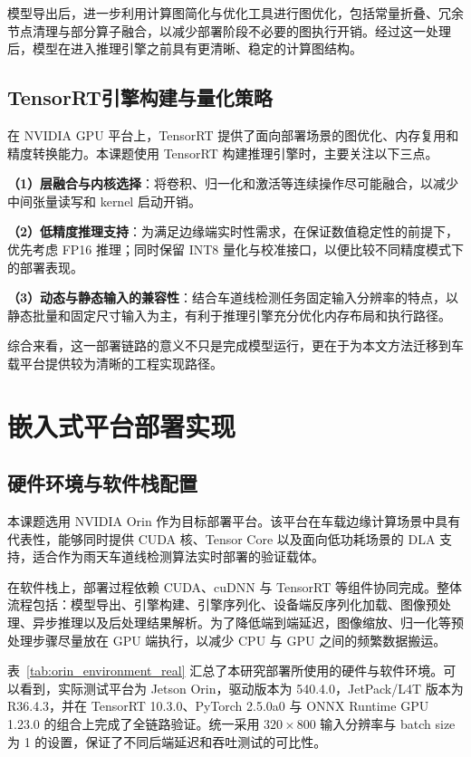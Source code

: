 模型导出后，进一步利用计算图简化与优化工具进行图优化，包括常量折叠、冗余节点清理与部分算子融合，以减少部署阶段不必要的图执行开销。经过这一处理后，模型在进入推理引擎之前具有更清晰、稳定的计算图结构。

\subsection{TensorRT引擎构建与量化策略}

在 NVIDIA GPU 平台上，TensorRT 提供了面向部署场景的图优化、内存复用和精度转换能力。本课题使用 TensorRT 构建推理引擎时，主要关注以下三点。

\textbf{（1）层融合与内核选择}：将卷积、归一化和激活等连续操作尽可能融合，以减少中间张量读写和 kernel 启动开销。

\textbf{（2）低精度推理支持}：为满足边缘端实时性需求，在保证数值稳定性的前提下，优先考虑 FP16 推理；同时保留 INT8 量化与校准接口，以便比较不同精度模式下的部署表现。

\textbf{（3）动态与静态输入的兼容性}：结合车道线检测任务固定输入分辨率的特点，以静态批量和固定尺寸输入为主，有利于推理引擎充分优化内存布局和执行路径。

综合来看，这一部署链路的意义不只是完成模型运行，更在于为本文方法迁移到车载平台提供较为清晰的工程实现路径。


\section{嵌入式平台部署实现}
\label{sec:orin_deployment}

\subsection{硬件环境与软件栈配置}

本课题选用 NVIDIA Orin 作为目标部署平台。该平台在车载边缘计算场景中具有代表性，能够同时提供 CUDA 核、Tensor Core 以及面向低功耗场景的 DLA 支持，适合作为雨天车道线检测算法实时部署的验证载体。

在软件栈上，部署过程依赖 CUDA、cuDNN 与 TensorRT 等组件协同完成。整体流程包括：模型导出、引擎构建、引擎序列化、设备端反序列化加载、图像预处理、异步推理以及后处理结果解析。为了降低端到端延迟，图像缩放、归一化等预处理步骤尽量放在 GPU 端执行，以减少 CPU 与 GPU 之间的频繁数据搬运。

表~\ref{tab:orin_environment_real} 汇总了本研究部署所使用的硬件与软件环境。可以看到，实际测试平台为 Jetson Orin，驱动版本为 540.4.0，JetPack/L4T 版本为 R36.4.3，并在 TensorRT 10.3.0、PyTorch 2.5.0a0 与 ONNX Runtime GPU 1.23.0 的组合上完成了全链路验证。统一采用 $320\times 800$ 输入分辨率与 batch size 为 1 的设置，保证了不同后端延迟和吞吐测试的可比性。

